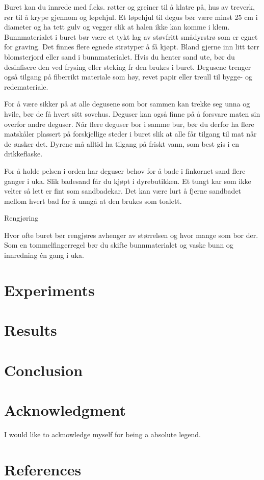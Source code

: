 \documentclass[conference]{IEEEtran}
\begin{document}
Buret kan du innrede med f.eks. røtter og greiner til å klatre på, hus av treverk, rør til å krype gjennom og løpehjul. Et løpehjul til degus bør være minst 25 cm i diameter og ha tett gulv og vegger slik at halen ikke kan komme i klem. Bunnmaterialet i buret bør være et tykt lag av støvfritt smådyrstrø som er egnet for graving. Det finnes flere egnede strøtyper å få kjøpt. Bland gjerne inn litt tørr blomsterjord eller sand i bunnmaterialet. Hvis du henter sand ute, bør du desinfisere den ved frysing eller steking fr den brukes i buret. Degusene trenger også tilgang på fiberrikt materiale som høy, revet papir eller treull til bygge- og redemateriale.

For å være sikker på at alle degusene som bor sammen kan trekke seg unna og hvile, bør de få hvert sitt sovehus. Deguser kan også finne på å forsvare maten sin overfor andre deguser. Når flere deguser bor i samme bur, bør du derfor ha flere matskåler plassert på forskjellige steder i buret slik at alle får tilgang til mat når de ønsker det. Dyrene må alltid ha tilgang på friskt vann, som best gis i en drikkeflaske.

For å holde pelsen i orden har deguser behov for å bade i finkornet sand flere ganger i uka. Slik badesand får du kjøpt i dyrebutikken. Et tungt kar som ikke velter så lett er fint som sandbadekar. Det kan være lurt å fjerne sandbadet mellom hvert bad for å unngå at den brukes som toalett.

Rengjøring

Hvor ofte buret bør rengjøres avhenger av størrelsen og hvor mange som bor der. Som en tommelfingerregel bør du skifte bunnmaterialet og vaske bunn og innredning én gang i uka. 

\section{Experiments}

\section{Results}

\section{Conclusion}


\section*{Acknowledgment}

I would like to acknowledge myself for being a absolute legend.

\section*{References}




\end{document}
